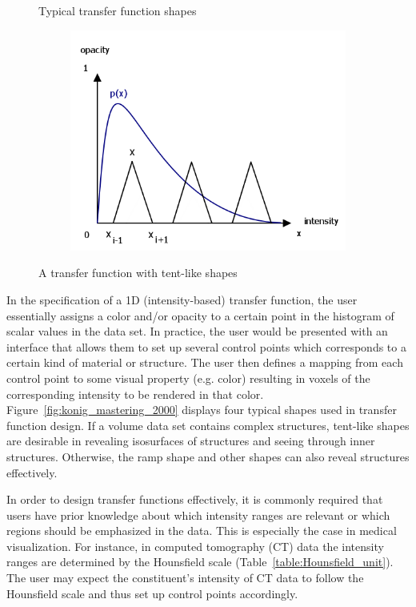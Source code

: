 \documentclass{egpubl}
\begin{document}
\begin{figure}
\begin{subfigure}{.2\textwidth}
	\end{subfigure}
	\caption{Typical transfer function shapes \cite{konig_mastering_2000}}
	\label{fig:konig_mastering_2000}
	\begin{subfigure}{.4\textwidth}
		\centering
		\includegraphics[width=1\textwidth]{drawing_distribution.png}
	\end{subfigure}
	\caption{A transfer function with tent-like shapes}
	\label{fig:drawing_distribution}
\end{figure}

In the specification of a 1D (intensity-based) transfer function, the user essentially assigns a color and/or opacity to a certain point in the histogram of scalar values in the data set. In practice, the user would be presented with an interface that allows them to set up several control points which corresponds to a certain kind of material or structure. The user then defines a mapping from each control point to some visual property (e.g. color) resulting in voxels of the corresponding intensity to be rendered in that color.
Figure~\ref{fig:konig_mastering_2000} displays four typical shapes used in transfer function design.
If a volume data set contains complex structures, tent-like shapes are desirable in revealing isosurfaces of structures and seeing through inner structures. Otherwise, the ramp shape and other shapes can also reveal structures effectively.%

In order to design transfer functions effectively, it is commonly required that users have prior knowledge about which intensity ranges are relevant or which regions should be emphasized in the data. This is especially the case in medical visualization. For instance, in computed tomography (CT) data the intensity ranges are determined by the Hounsfield scale (Table~\ref{table:Hounsfield_unit}). The user may expect the constituent's intensity of CT data to follow the Hounsfield scale and thus set up control points accordingly.
\end{document}
